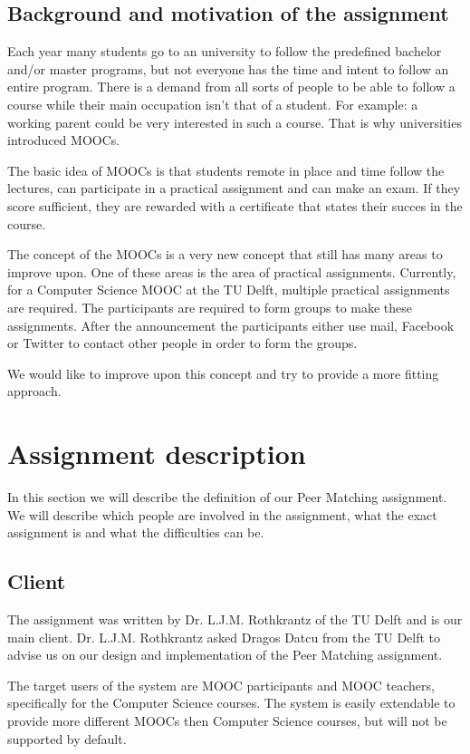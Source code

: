 \documentclass[]{article}
\begin{document}
\subsection{Background and motivation of the assignment}
Each year many students go to an university to follow the predefined bachelor and/or master programs, but not everyone has the time and intent to follow an entire program.
There is a demand from all sorts of people to be able to follow a course while their main occupation isn't that of a student.
For example: a working parent could be very interested in such a course.
That is why universities introduced MOOCs.

The basic idea of MOOCs is that students remote in place and time follow the lectures, can participate in a practical assignment and can make an exam.
If they score sufficient, they are rewarded with a certificate that states their succes in the course.

The concept of the MOOCs is a very new concept that still has many areas to improve upon.
One of these areas is the area of practical assignments.
Currently, for a Computer Science MOOC at the TU Delft, multiple practical assignments are required.
The participants are required to form groups to make these assignments.
After the announcement the participants either use mail, Facebook or  Twitter to contact other people in order to form the groups.

We would like to improve upon this concept and try to provide a more fitting approach.
\section{Assignment description}
In this section we will describe the definition of our Peer Matching assignment. 
We will describe which people are involved in the assignment, what the exact assignment is and what the difficulties can be.

\subsection{Client}
The assignment was written by Dr. L.J.M. Rothkrantz of the TU Delft and is our main client.
Dr. L.J.M. Rothkrantz asked Dragos Datcu from the TU Delft to advise us on our design and implementation of the Peer Matching assignment.

The target users of the system are MOOC participants and MOOC teachers, specifically for the Computer Science courses. The system is easily extendable to provide more different MOOCs then Computer Science courses, but will not be supported by default.
\end{document}
